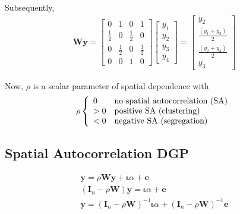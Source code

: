 Subsequently,
\begin{eqnarray}
\boldsymbol{W}\boldsymbol{y} =
\begin{bmatrix}
  0 & 1 & 0 & 1\\
  \frac{1}{2} & 0 & \frac{1}{2} & 0\\
  0 & \frac{1}{2} & 0 & \frac{1}{2}\\
  0 & 0 & 1 & 0
\end{bmatrix}
\begin{bmatrix}
  y_{1}\\
  y_{2}\\
  y_{3}\\
  y_{4}
\end{bmatrix}
=
\begin{bmatrix}
  y_{2}\\
  \frac{(y_{1} + y_{2})}{2}\\
  \frac{(y_{2} + y_{4})}{2}\\
  y_{3}
\end{bmatrix}
\end{eqnarray}

Now, $\rho$ is a scalar parameter of spatial dependence with
\begin{eqnarray}
\rho
 \left\{ 
  \begin{array}{l l}
    0 & \text{no spatial autocorrelation (SA)}\\
    > 0 & \text{positive SA (clustering)}\\
    < 0 & \text{negative SA (segregation)}
  \end{array} 
 \right. %
\end{eqnarray}

\subsection{Spatial Autocorrelation DGP}
\begin{eqnarray}
\boldsymbol{y} = \rho\boldsymbol{W}\boldsymbol{y} + \boldsymbol{\iota}\alpha + \boldsymbol{e}\\
(\boldsymbol{I}_n - \rho\boldsymbol{W})\boldsymbol{y} = \boldsymbol{\iota}\alpha + \boldsymbol{e}\\
\boldsymbol{y} = (\boldsymbol{I}_n - \rho\boldsymbol{W})^{-1}\boldsymbol{\iota}\alpha + (\boldsymbol{I}_n - \rho\boldsymbol{W})^{-1}\boldsymbol{e}
\end{eqnarray}

